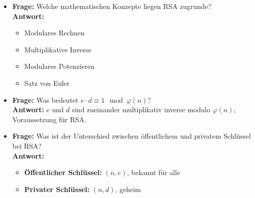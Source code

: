 \documentclass[a4paper,12pt]{article}
\begin{document}
\begin{itemize}[leftmargin=*]
  \item \textbf{Frage:} Welche mathematischen Konzepte liegen RSA zugrunde?\\
  \textbf{Antwort:} 
  \begin{itemize}
    \item Modulares Rechnen
    \item Multiplikative Inverse
    \item Modulares Potenzieren
    \item Satz von Euler
  \end{itemize}

  \item \textbf{Frage:} Was bedeutet \(e \cdot d \equiv 1 \mod \varphi(n)\)?\\
  \textbf{Antwort:} \(e\) und \(d\) sind zueinander multiplikativ inverse modulo \(\varphi(n)\); Voraussetzung für RSA.

  \item \textbf{Frage:} Was ist der Unterschied zwischen öffentlichem und privatem Schlüssel bei RSA?\\
  \textbf{Antwort:}
  \begin{itemize}
    \item \textbf{Öffentlicher Schlüssel:} \((n, e)\), bekannt für alle
    \item \textbf{Privater Schlüssel:} \((n, d)\), geheim
  \end{itemize}
\end{itemize}
\end{document}
